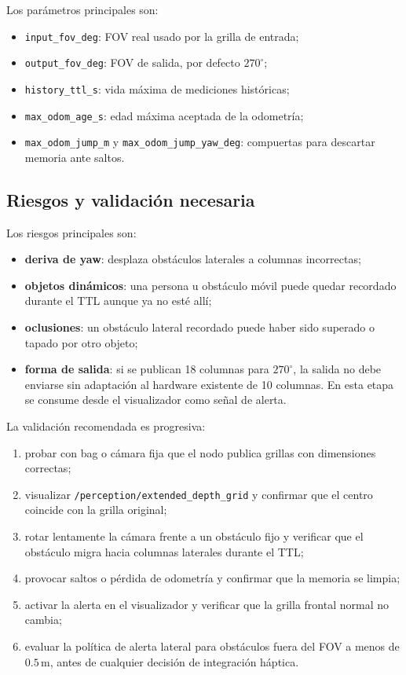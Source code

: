 Los parámetros principales son:

\begin{itemize}
  \item \texttt{input\_fov\_deg}: FOV real usado por la grilla de entrada;
  \item \texttt{output\_fov\_deg}: FOV de salida, por defecto \(270^\circ\);
  \item \texttt{history\_ttl\_s}: vida máxima de mediciones históricas;
  \item \texttt{max\_odom\_age\_s}: edad máxima aceptada de la odometría;
  \item \texttt{max\_odom\_jump\_m} y \texttt{max\_odom\_jump\_yaw\_deg}: compuertas
  para descartar memoria ante saltos.
\end{itemize}

\subsection{Riesgos y validación necesaria}

Los riesgos principales son:

\begin{itemize}
  \item \textbf{deriva de yaw}: desplaza obstáculos laterales a columnas incorrectas;
  \item \textbf{objetos dinámicos}: una persona u obstáculo móvil puede quedar recordado
  durante el TTL aunque ya no esté allí;
  \item \textbf{oclusiones}: un obstáculo lateral recordado puede haber sido superado o
  tapado por otro objeto;
  \item \textbf{forma de salida}: si se publican 18 columnas para \(270^\circ\), la salida
  no debe enviarse sin adaptación al hardware existente de 10 columnas. En esta etapa se
  consume desde el visualizador como señal de alerta.
\end{itemize}

La validación recomendada es progresiva:

\begin{enumerate}
  \item probar con bag o cámara fija que el nodo publica grillas con dimensiones correctas;
  \item visualizar \texttt{/perception/extended\_depth\_grid} y confirmar que el centro
  coincide con la grilla original;
  \item rotar lentamente la cámara frente a un obstáculo fijo y verificar que el obstáculo
  migra hacia columnas laterales durante el TTL;
  \item provocar saltos o pérdida de odometría y confirmar que la memoria se limpia;
  \item activar la alerta en el visualizador y verificar que la grilla frontal normal no
  cambia;
  \item evaluar la política de alerta lateral para obstáculos fuera del FOV a menos de
  \(0.5\,\mathrm{m}\), antes de cualquier decisión de integración háptica.
\end{enumerate}

